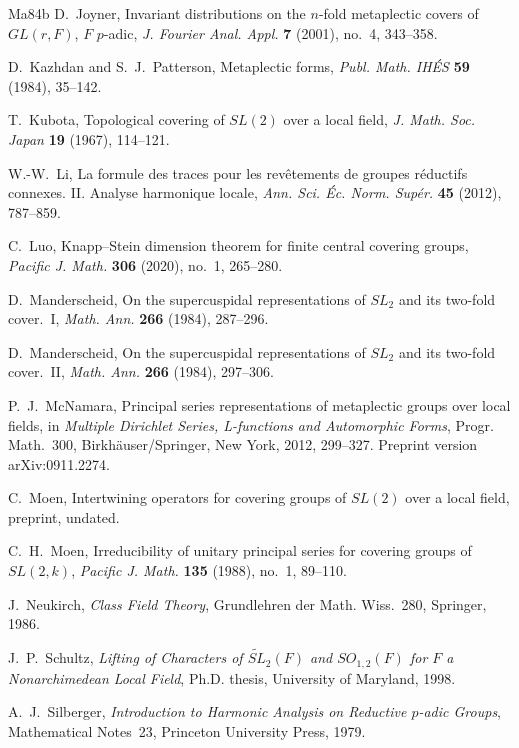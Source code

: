 \documentclass[12pt,letterpaper]{article}
\numberwithin{equation}{section}
\theoremstyle{plain}
\theoremstyle{definition}
\theoremstyle{remark}
\begin{document}
\begin{thebibliography}{Ma84b}
 D.~Joyner, Invariant distributions on the $n$-fold
metaplectic covers of $GL(r,F)$, $F$ $p$-adic, \emph{J. Fourier Anal.
Appl.} \textbf{7} (2001), no.~4, 343--358.

 D.~Kazhdan and S.~J.~Patterson, Metaplectic forms,
\emph{Publ. Math. IH\'ES} \textbf{59} (1984), 35--142.

 T.~Kubota, Topological covering of $SL(2)$ over a
local field, \emph{J. Math. Soc. Japan} \textbf{19} (1967), 114--121.

 W.-W.~Li, La formule des traces pour les
rev\^etements de groupes r\'eductifs connexes. II. Analyse harmonique
locale, \emph{Ann. Sci. \'Ec. Norm. Sup\'er.} \textbf{45} (2012),
787--859.

 C.~Luo, Knapp--Stein dimension theorem for finite
central covering groups, \emph{Pacific J. Math.} \textbf{306} (2020),
no.~1, 265--280.

 D.~Manderscheid, On the supercuspidal
representations of $SL_2$ and its two-fold cover.~I, \emph{Math.
Ann.} \textbf{266} (1984), 287--296.

 D.~Manderscheid, On the supercuspidal
representations of $SL_2$ and its two-fold cover.~II, \emph{Math.
Ann.} \textbf{266} (1984), 297--306.

 P.~J.~McNamara, Principal series representations
of metaplectic groups over local fields, in \emph{Multiple Dirichlet
Series, L-functions and Automorphic Forms}, Progr. Math.~300,
Birkh\"auser/Springer, New York, 2012, 299--327. Preprint version
arXiv:0911.2274.

 C.~Moen, Intertwining operators for covering groups of
$SL(2)$ over a local field, preprint, undated.

 C.~H.~Moen, Irreducibility of unitary principal
series for covering groups of $SL(2,k)$, \emph{Pacific J. Math.}
\textbf{135} (1988), no.~1, 89--110.

 J.~Neukirch, \emph{Class Field Theory},
Grundlehren der Math. Wiss.~280, Springer, 1986.

 J.~P.~Schultz, \emph{Lifting of Characters of
$\widetilde{SL}_2(F)$ and $SO_{1,2}(F)$ for $F$ a Nonarchimedean Local
Field}, Ph.D. thesis, University of Maryland, 1998.

 A.~J.~Silberger, \emph{Introduction to Harmonic
Analysis on Reductive $p$-adic Groups}, Mathematical Notes~23,
Princeton University Press, 1979.


\end{thebibliography}
\end{document}
